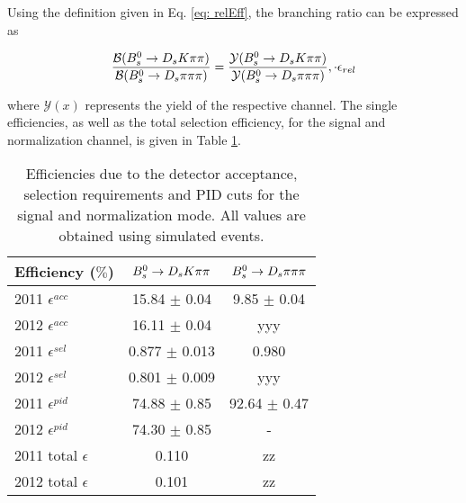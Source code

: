  Using the definition given in Eq. \ref{eq: relEff}, the branching ratio can be expressed as

\begin{equation}
\frac{\mathcal{B}({{B}^0_{s}}\rightarrow{\ensuremath{{D}_{s}}}{\ensuremath{K}}{\ensuremath{\pi}}{\ensuremath{\pi}})}{\mathcal{B}({{B}^0_{s}}\rightarrow{\ensuremath{{D}_{s}}}{\ensuremath{\pi}}{\ensuremath{\pi}}{\ensuremath{\pi}})} = \frac{\mathcal{Y}({{B}^0_{s}}\rightarrow{\ensuremath{{D}_{s}}}{\ensuremath{K}}{\ensuremath{\pi}}{\ensuremath{\pi}})}{\mathcal{Y}({{B}^0_{s}}\rightarrow{\ensuremath{{D}_{s}}}{\ensuremath{\pi}}{\ensuremath{\pi}}{\ensuremath{\pi}})},
\cdot \epsilon_{rel}
\label{eq: BRwEff}
\end{equation} 

where $\mathcal{Y}(x)$ represents the yield of the respective channel. \newline
The single efficiencies, as well as the total selection efficiency, for the signal and normalization channel, is given in Table \ref{tab: effTab}.

\begin{table}[h!]
\centering
\begin{tabular}{l c c}
Efficiency ($\%$) & ${{B}^0_{s}}\rightarrow{\ensuremath{{D}_{s}}}{\ensuremath{K}}{\ensuremath{\pi}}{\ensuremath{\pi}}$ & ${{B}^0_{s}}\rightarrow{\ensuremath{{D}_{s}}}{\ensuremath{\pi}}{\ensuremath{\pi}}{\ensuremath{\pi}}$\\
\hline
2011 $\epsilon^{acc}$ & 15.84 $\pm$ 0.04 & 9.85 $\pm$ 0.04\\
2012 $\epsilon^{acc}$ & 16.11 $\pm$ 0.04 & yyy\\
2011 $\epsilon^{sel}$ & 0.877 $\pm$ 0.013& 0.980\\
2012 $\epsilon^{sel}$ & 0.801 $\pm$ 0.009& yyy\\
2011 $\epsilon^{pid}$ & 74.88 $\pm$ 0.85 & 92.64 $\pm$ 0.47\\
2012 $\epsilon^{pid}$ & 74.30 $\pm$ 0.85 & -\\
\hline
2011 total $\epsilon$ & 0.110 & zz\\
2012 total $\epsilon$ & 0.101 & zz\\
\hline
\end{tabular}
\caption{Efficiencies due to the detector acceptance, selection requirements and PID cuts for the signal and normalization mode. All values are obtained using simulated events.}
\label{tab: effTab}
\end{table}





